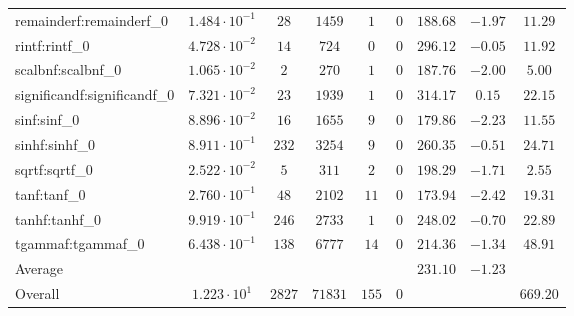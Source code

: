 \begin{tabular}{|l|c|c|c|c|c|c|c|c|}
remainderf:remainderf\_0     & $ 1.484 \cdot 10^{-1} $ & $ 28     $ & $ 1459  $ & $ 1   $ & $ 0   $ & $ 188.68      $ & $ -1.97   $ & $ 11.29   $ \\
rintf:rintf\_0               & $ 4.728 \cdot 10^{-2} $ & $ 14     $ & $ 724   $ & $ 0   $ & $ 0   $ & $ 296.12      $ & $ -0.05   $ & $ 11.92   $ \\
scalbnf:scalbnf\_0           & $ 1.065 \cdot 10^{-2} $ & $ 2      $ & $ 270   $ & $ 1   $ & $ 0   $ & $ 187.76      $ & $ -2.00   $ & $ 5.00    $ \\
significandf:significandf\_0 & $ 7.321 \cdot 10^{-2} $ & $ 23     $ & $ 1939  $ & $ 1   $ & $ 0   $ & $ 314.17      $ & $ 0.15    $ & $ 22.15   $ \\
sinf:sinf\_0                 & $ 8.896 \cdot 10^{-2} $ & $ 16     $ & $ 1655  $ & $ 9   $ & $ 0   $ & $ 179.86      $ & $ -2.23   $ & $ 11.55   $ \\
sinhf:sinhf\_0               & $ 8.911 \cdot 10^{-1} $ & $ 232    $ & $ 3254  $ & $ 9   $ & $ 0   $ & $ 260.35      $ & $ -0.51   $ & $ 24.71   $ \\
sqrtf:sqrtf\_0               & $ 2.522 \cdot 10^{-2} $ & $ 5      $ & $ 311   $ & $ 2   $ & $ 0   $ & $ 198.29      $ & $ -1.71   $ & $ 2.55    $ \\
tanf:tanf\_0                 & $ 2.760 \cdot 10^{-1} $ & $ 48     $ & $ 2102  $ & $ 11  $ & $ 0   $ & $ 173.94      $ & $ -2.42   $ & $ 19.31   $ \\
tanhf:tanhf\_0               & $ 9.919 \cdot 10^{-1} $ & $ 246    $ & $ 2733  $ & $ 1   $ & $ 0   $ & $ 248.02      $ & $ -0.70   $ & $ 22.89   $ \\
tgammaf:tgammaf\_0           & $ 6.438 \cdot 10^{-1} $ & $ 138    $ & $ 6777  $ & $ 14  $ & $ 0   $ & $ 214.36      $ & $ -1.34   $ & $ 48.91   $ \\
\hline
Average                      & $                     $ & $        $ & $       $ & $     $ & $     $ & $ 231.10      $ & $ -1.23   $ & $         $ \\
\hline
Overall                      & $ 1.223 \cdot 10^{1}  $ & $ 2827   $ & $ 71831 $ & $ 155 $ & $ 0   $ & $             $ & $         $ & $ 669.20  $ \\
\hline
\end{tabular}
